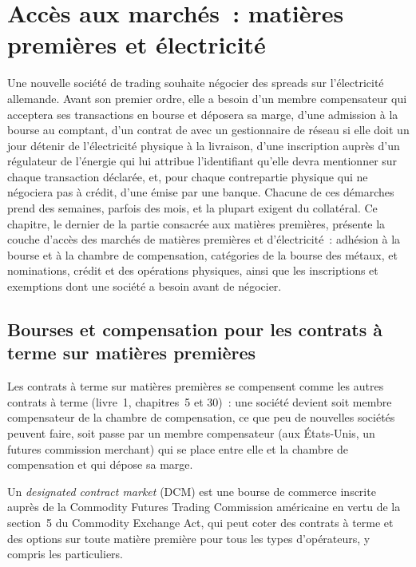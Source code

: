 \chapter{Accès aux marchés~: matières premières et électricité}\label{ch:m3:getting-access-commodities-and-power}

Une nouvelle société de trading souhaite négocier des spreads sur l'électricité allemande. Avant son premier ordre, elle a besoin
d'un membre compensateur qui acceptera ses transactions en bourse et déposera sa marge, d'une admission à la bourse au comptant,
d'un contrat de  avec un gestionnaire de réseau si elle doit un jour détenir de l'électricité physique
à la livraison, d'une inscription auprès d'un régulateur de l'énergie qui lui attribue l'identifiant qu'elle devra mentionner
sur chaque transaction déclarée, et, pour chaque contrepartie physique qui ne négociera pas à crédit, d'une 
émise par une banque. Chacune de ces démarches prend des semaines, parfois des mois, et la plupart exigent du collatéral.
Ce chapitre, le dernier de la partie consacrée aux matières premières, présente la couche d'accès
des marchés de matières premières et d'électricité~: adhésion à la bourse et à la chambre de compensation, catégories de la
bourse des métaux,  et nominations, crédit et  des opérations physiques,
ainsi que les inscriptions et exemptions dont une société a besoin avant de négocier.

\section{Bourses et compensation pour les contrats à terme sur matières premières}

Les contrats à terme sur matières premières se compensent comme les autres contrats à terme (livre~1, chapitres~5 et 30)~: une société
devient soit membre compensateur de la chambre de compensation, ce que peu de nouvelles sociétés peuvent faire, soit passe par
un membre compensateur (aux États-Unis, un futures commission merchant) qui se place entre elle et
la chambre de compensation et qui dépose sa marge.

\begin{definition}\label{def:m3:getting-access-commodities-and-power:dcm}
Un \emph{designated contract market} (DCM) est une bourse de commerce
inscrite auprès de la Commodity Futures Trading Commission américaine en vertu de la section~5 du Commodity Exchange
Act, qui peut coter des contrats à terme et des options sur toute matière première pour tous les types d'opérateurs, y compris les particuliers.
\end{definition}

